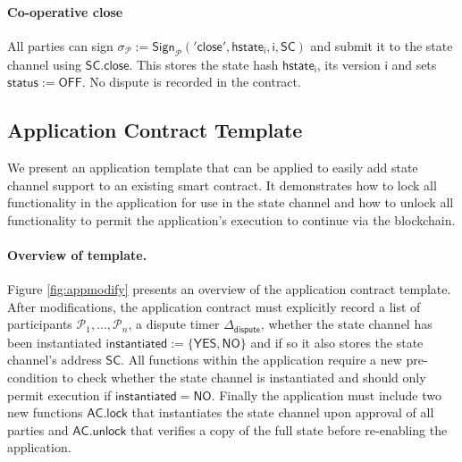 \documentclass{llncs}
\newcommand{\instantiated}{\mathsf{instantiated}}
\newcommand{\instantiatedno}{\mathsf{NO}}
\newcommand{\instantiatedyes}{\mathsf{YES}}
\newcommand{\chanstatus}{\mathsf{status}}
\newcommand{\chanoff}{\mathsf{OFF}}
\newcommand{\hstatei}{\mathsf{hstate}_{\monotoniccounter}}
\newcommand{\monotoniccounter}{\mathsf{i}}
\newcommand{\participant}{\mathcal{P}}
\newcommand{\statechannel}{\mathsf{SC}}
\newcommand{\statechannelclose}{\mathsf{SC}.\mathsf{close}}
\newcommand{\sign}{\mathsf{Sign}}
\newcommand{\applock}{\mathsf{AC.lock}}
\newcommand{\appunlock}{\mathsf{AC.unlock}}
\newcommand{\timerdispute}{\mathsf{\Delta}_{\mathsf{dispute}}}
\begin{document}
	\paragraph{Co-operative close}
	All parties can sign 
	$\sigma_{\participant} := \sign_{\participant}(\mathsf{'close'},\hstatei, \monotoniccounter, \statechannel)$ and submit it to the state channel using $\statechannelclose$.
	This stores the state hash $\hstatei$, its version $\monotoniccounter$ and sets $\chanstatus := \chanoff$. 
	No dispute is recorded in the contract. 
	
	\subsection{Application Contract Template}
	
	We present an application template that can be applied to easily add state channel support to an existing smart contract. 
	It demonstrates how to lock all functionality in the application for use in the state channel and how to unlock all functionality to permit the application's execution to continue via the blockchain. 
	
	
	\paragraph{Overview of template. } \label{sec:template} 
	Figure \ref{fig:appmodify} presents an overview of the application contract template.
	After modifications, the application contract must explicitly record a list of participants $\participant_{1},...,\participant_{n}$, a dispute timer $\timerdispute$, whether the state channel has been instantiated  $\instantiated := \{\instantiatedyes, \instantiatedno\}$ and if so it also stores the state channel's address  $\statechannel$. 
	All functions within the application require a new pre-condition to check whether the state channel is instantiated and should only permit execution if $\instantiated = \instantiatedno$. 
	Finally the application must include two new functions $\applock$ that instantiates the state channel upon approval of all parties and $\appunlock$ that verifies a copy of the full state before re-enabling the application. 
	
	
	
\end{document}
